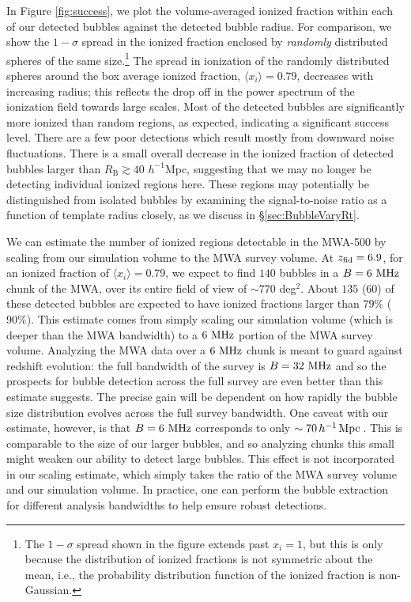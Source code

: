 In Figure \ref{fig:success}, we plot the volume-averaged ionized fraction within each of our
detected bubbles against
the detected bubble radius. For comparison, we show
the $1-\sigma$ spread in the ionized fraction enclosed by {\em randomly} distributed
spheres of the same size.\footnote{The $1-\sigma$ spread shown in the figure extends past $x_i = 1$, but this is only because the distribution of ionized fractions is not symmetric about the mean, i.e., the probability
distribution function of the ionized fraction is non-Gaussian.} The spread in ionization of the randomly distributed spheres around
the box average ionized fraction, $\langle x_i \rangle = 0.79$, decreases with increasing radius; this
reflects the drop off in the power spectrum of the ionization field towards large scales.
Most of the detected bubbles 
are significantly more ionized than random regions, as expected, indicating
a significant success level. There are a few poor detections which result mostly from
downward noise fluctuations. There is a small overall decrease in the ionized
fraction of detected bubbles larger than $R_{\text{B}} \gtrsim 40$ $h^{-1}$Mpc, suggesting that
we may no longer be detecting individual ionized regions here. These
regions may potentially be distinguished from isolated bubbles by examining
the signal-to-noise ratio as a function of template radius closely, as
we discuss in \S\ref{sec:BubbleVaryRt}.

We can estimate the number of ionized regions detectable in the MWA-500
by scaling from our simulation volume to the MWA survey volume.
At $z_{\rm fid} = 6.9$, for an ionized fraction of $\langle x_i \rangle = 0.79$,
we expect to find $140$ bubbles in a $B=6 \ \text{MHz}$ chunk of the
MWA, over its entire field of view of $\sim 770$ deg$^2$.
About $135$ ($60$) of these detected bubbles are expected to
have ionized fractions larger than $79\%$ ($90\%$). 
This estimate
comes from simply scaling our simulation volume (which is deeper
than the MWA bandwidth) to a $6 \ \text{MHz}$ portion of the MWA survey volume. 
Analyzing the MWA data over a $6 \ \text{MHz}$ 
chunk is meant to guard against redshift evolution: the full bandwidth
of the survey is $B = 32 \ \text{MHz}$ and so the prospects for bubble detection
across the full survey are even better than this estimate suggests.
The precise gain will be dependent on how rapidly the bubble size distribution
evolves across the full survey bandwidth. One caveat with our estimate, however,
is that $B=6 \ \text{MHz}$ corresponds to only $\sim 70\,h^{-1}\,{\rm Mpc}\,$. This is comparable
to the size of our larger bubbles, and so analyzing chunks this small
might weaken our ability to detect large bubbles. This effect
is not incorporated in our scaling estimate, which simply
takes the ratio of the MWA survey volume and our simulation volume.
In practice, one can perform the bubble extraction for different
analysis bandwidths to help ensure robust detections.



